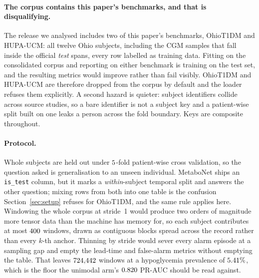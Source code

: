 \paragraph{The corpus contains this paper's benchmarks, and that is disqualifying.}
The release we analysed includes two of this paper's benchmarks, OhioT1DM and
HUPA-UCM:
all twelve Ohio subjects, including the CGM samples that fall inside the official
\emph{test} spans, every row labelled as training data. Fitting on the
consolidated corpus and reporting on either benchmark is training on the test
set, and the resulting metrics would improve rather than fail visibly.
OhioT1DM and HUPA-UCM are therefore dropped from the corpus by default and the
loader refuses them explicitly. A second hazard is quieter: subject
identifiers collide across source studies, so a bare identifier is not a subject
key and a patient-wise split built on one leaks a person across the fold
boundary. Keys are composite throughout.

\paragraph{Protocol.} Whole subjects are held out under
$5$-fold patient-wise cross validation, so the question asked is
generalisation to an unseen individual. MetaboNet ships an \texttt{is\_test}
column, but it marks a \emph{within}-subject temporal split and answers the
other question; mixing rows from both into one table is the confusion
Section~\ref{sec:setup} refuses for OhioT1DM, and the same rule applies here.
Windowing the whole corpus at stride~1 would produce two orders of magnitude
more tensor data than the machine has memory for, so each subject contributes
at most $400$ windows, drawn as
contiguous blocks spread across the record rather than every $k$-th anchor.
Thinning by stride would sever every alarm episode at a sampling gap and empty
the lead-time and false-alarm metrics without emptying the table. That leaves
$724{,}442$ windows at a hypoglycemia prevalence of
$5.41\%$, which is the floor the unimodal arm's
$0.820$ PR-AUC should be read against.

